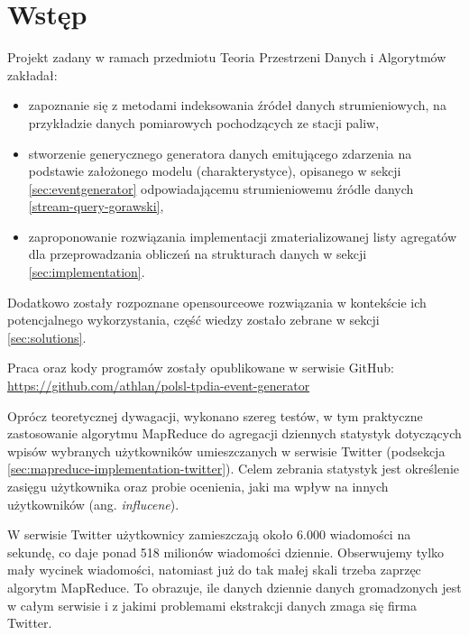\section{Wstęp}
\label{sec:intro}

Projekt zadany w ramach przedmiotu Teoria Przestrzeni Danych i Algorytmów zakładał:

\begin{itemize}[noitemsep]
  \item zapoznanie się z metodami indeksowania źródeł danych strumieniowych, na przykładzie danych pomiarowych pochodzących ze stacji paliw,
  \item stworzenie generycznego generatora danych emitującego zdarzenia na podstawie założonego modelu (charakterystyce), opisanego w sekcji \ref{sec:eventgenerator} odpowiadającemu strumieniowemu źródle danych \ref{stream-query-gorawski},
  \item zaproponowanie rozwiązania implementacji zmaterializowanej listy agregatów dla przeprowadzania obliczeń na strukturach danych w sekcji \ref{sec:implementation}.
\end{itemize}

Dodatkowo zostały rozpoznane opensourceowe rozwiązania w kontekście ich potencjalnego wykorzystania, część wiedzy zostało zebrane w sekcji \ref{sec:solutions}.

Praca oraz kody programów zostały opublikowane w serwisie GitHub:\\
\url{https://github.com/athlan/polsl-tpdia-event-generator}

Oprócz teoretycznej dywagacji, wykonano szereg testów, w tym praktyczne zastosowanie algorytmu MapReduce do agregacji dziennych statystyk dotyczących wpisów wybranych użytkowników umieszczanych w serwisie Twitter (podsekcja \ref{sec:mapreduce-implementation-twitter}). Celem zebrania statystyk jest określenie zasięgu użytkownika oraz probie ocenienia, jaki ma wpływ na innych użytkowników (ang. \emph{influcene}).

W serwisie Twitter użytkownicy zamieszczają około 6.000 wiadomości na sekundę, co daje ponad 518 milionów wiadomości dziennie. Obserwujemy tylko mały wycinek wiadomości, natomiast już do tak małej skali trzeba zaprzęc algorytm MapReduce. To obrazuje, ile danych dziennie danych gromadzonych jest w całym serwisie i z jakimi problemami ekstrakcji danych zmaga się firma Twitter.

